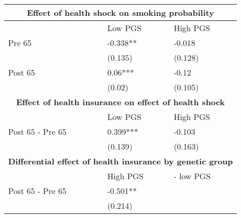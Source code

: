 % 
\begin{tabular}{lll}
  \toprule
  \multicolumn{3}{c}{ \textbf{Effect of health shock on smoking probability}} \\
 \midrule
 & Low PGS & High PGS \\ 
   \midrule
Pre 65 & -0.338** & -0.018 \\ 
   & (0.135) & (0.128) \\ 
  Post 65 & 0.06*** & -0.12 \\ 
   & (0.02) & (0.105) \\ 
   \toprule \multicolumn{3}{c}{ \textbf{Effect of health insurance on effect of health shock}} \\
 \midrule
 & Low PGS & High PGS \\ 
   \midrule
Post 65 - Pre 65 & 0.399*** & -0.103 \\ 
   & (0.139) & (0.163) \\ 
   \toprule \multicolumn{3}{c}{ \textbf{Differential effect of health insurance by genetic group}} \\
 \midrule
 & High PGS  & - low PGS \\ 
   \midrule
Post 65 - Pre 65 & -0.501** &  \\ 
   & (0.214) &  \\ 
   \bottomrule
\end{tabular}
